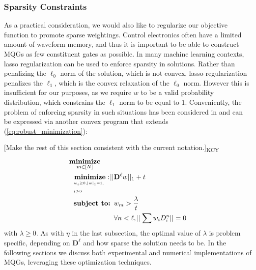 \documentclass[aps,nofootinbib,pra,notitlepage,twocolumn]{revtex4-1}
\makeatletter
\newcommand{\kcy}[1]{{\color{red}[#1]\textsubscript{\rm{KCY}}}}
\newcommand{\0}{\ensuremath{\mathbf{0}}}
\newcommand{\weight}{\ensuremath{w}}
\newcommand{\bunderbrace}[2]{
  \begin{array}[t]{@{}c@{}}
  	#1\\
  	\parbox{\widthof{#1}}{$\scriptscriptstyle#2$}
  \end{array}}
\makeatother
\begin{document}

\subsubsection{Sparsity Constraints}
\label{sec:sparsity}
As a practical consideration, we would also like to regularize our objective function to promote sparse weightings. Control electronics often have a limited amount of waveform memory, and thus it is important to be able to construct MQGs as few constituent gates as possible. In many machine learning contexts, lasso regularization \cite{tibshirani1996regression} can be used to enforce sparsity in solutions. Rather than penalizing the $\ell_0$ norm of the solution, which is not convex, lasso regularization penalizes the $\ell_1$, which is the convex relaxation of the $\ell_0$ norm. However this is insufficient for our purposes, as we require $\weight$ to be a valid probability distribution, which constrains the $\ell_1$ norm to be equal to $1$. Conveniently, the problem of enforcing sparsity in such situations has been considered in \cite{NIPS2012_4504} and can be expressed via another convex program that extends (\ref{eq:robust_minimization}):

\kcy{Make the rest of this section consistent with the current notation.}
\begin{equation}\label{eq:minimization_regularization}
\begin{split}
&\underset{m\in[N]}{\textbf{minimize}}\\
&\ \ \bunderbrace{\textbf{minimize}: }{\weight_i\geq0, |\weight|_1=1,\\ t\geq0} ||{\mathbf{D}^{\ell}}\weight||_1 + t\\
&\ \ \textbf{subject to: } \weight_m > \frac{\lambda}{t}\\
&\ \ \phantom{\textbf{subject to: }} \forall n<\ell, ||\sum \weight_iD_i^n||=0
\end{split}
\end{equation} with $\lambda\geq0$. As with $\eta$ in the last subsection, the optimal value of $\lambda$ is problem specific, depending on $\mathbf{D}^\ell$ and how sparse the solution needs to be. In the following sections we discuss both experimental and numerical implementations of MQGs, leveraging these optimization techniques. 
\end{document}
